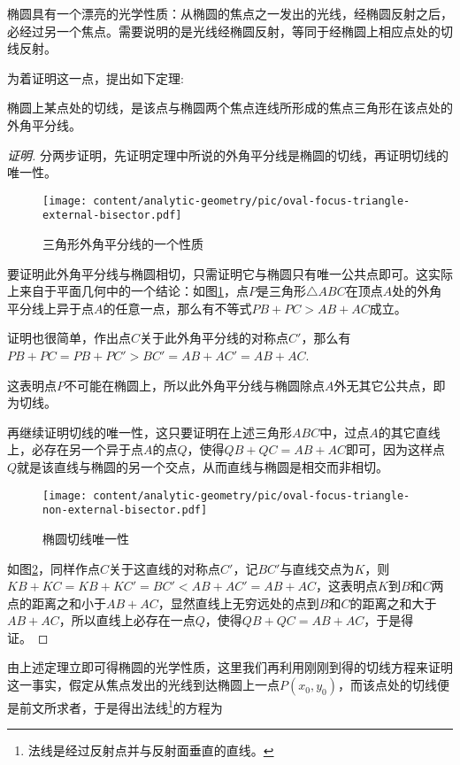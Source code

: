 椭圆具有一个漂亮的光学性质：从椭圆的焦点之一发出的光线，经椭圆反射之后，必经过另一个焦点。需要说明的是光线经椭圆反射，等同于经椭圆上相应点处的切线反射。

为着证明这一点，提出如下定理:
\begin{theorem}[椭圆切线定理]
  椭圆上某点处的切线，是该点与椭圆两个焦点连线所形成的焦点三角形在该点处的外角平分线。
\end{theorem}

\begin{proof}[证明]
  分两步证明，先证明定理中所说的外角平分线是椭圆的切线，再证明切线的唯一性。

\begin{figure}[htbp]
  \centering
\texttt{[image: content/analytic-geometry/pic/oval-focus-triangle-external-bisector.pdf]}
\caption{三角形外角平分线的一个性质}
\label{fig:oval-focus-triangle-external-bisector}
\end{figure}

  要证明此外角平分线与椭圆相切，只需证明它与椭圆只有唯一公共点即可。这实际上来自于平面几何中的一个结论：如图\ref{fig:oval-focus-triangle-external-bisector}，点$P$是三角形$\triangle ABC$在顶点$A$处的外角平分线上异于点$A$的任意一点，那么有不等式$PB+PC>AB+AC$成立。

  证明也很简单，作出点$C$关于此外角平分线的对称点$C'$，那么有$PB+PC=PB+PC' > BC' = AB + AC' = AB+AC$.

  这表明点$P$不可能在椭圆上，所以此外角平分线与椭圆除点$A$外无其它公共点，即为切线。

  再继续证明切线的唯一性，这只要证明在上述三角形$ABC$中，过点$A$的其它直线上，必存在另一个异于点$A$的点$Q$，使得$QB+QC=AB+AC$即可，因为这样点$Q$就是该直线与椭圆的另一个交点，从而直线与椭圆是相交而非相切。

\begin{figure}[htbp]
  \centering
\texttt{[image: content/analytic-geometry/pic/oval-focus-triangle-non-external-bisector.pdf]}
\caption{椭圆切线唯一性}
\label{fig:oval-focus-triangle-non-external-bisector}
\end{figure}

  如图\ref{fig:oval-focus-triangle-non-external-bisector}，同样作点$C$关于这直线的对称点$C'$，记$BC'$与直线交点为$K$，则$KB+KC=KB+KC'=BC'<AB+AC'=AB+AC$，这表明点$K$到$B$和$C$两点的距离之和小于$AB+AC$，显然直线上无穷远处的点到$B$和$C$的距离之和大于$AB+AC$，所以直线上必存在一点$Q$，使得$QB+QC=AB+AC$，于是得证。
\end{proof}

由上述定理立即可得椭圆的光学性质，这里我们再利用刚刚到得的切线方程来证明这一事实，假定从焦点发出的光线到达椭圆上一点$P(x_0,y_0)$，而该点处的切线便是前文所求者，于是得出法线\footnote{法线是经过反射点并与反射面垂直的直线。}的方程为

